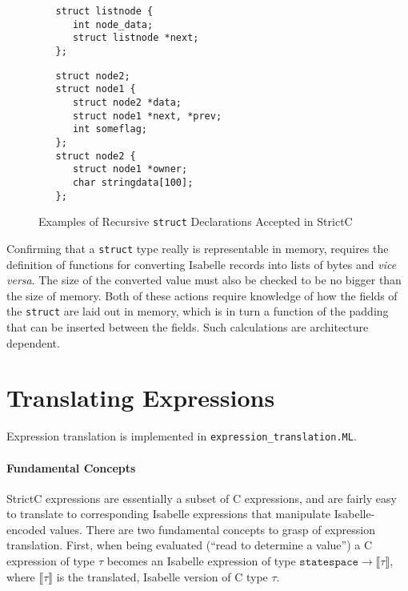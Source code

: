 \documentclass{article}
\newcommand{\strictc}{\textsf{StrictC}}
\newcommand{\MLsuffix}{.ML}
\newcommand{\srcfile}[1]{\texttt{#1}}
\newcommand{\MLfile}[1]{\srcfile{#1\MLsuffix}}
\newcommand{\Sem}[1]{\ensuremath{\llbracket#1\rrbracket}}
\begin{document}
\begin{figure}
\begin{minipage}[t]{0.4\textwidth}
\begin{verbatim}
   struct listnode {
      int node_data;
      struct listnode *next;
   };
\end{verbatim}
\end{minipage}
\qquad\quad
\begin{minipage}[t]{0.4\textwidth}
\begin{verbatim}
   struct node2;
   struct node1 {
      struct node2 *data;
      struct node1 *next, *prev;
      int someflag;
   };
   struct node2 {
      struct node1 *owner;
      char stringdata[100];
   };
\end{verbatim}
\end{minipage}
\caption{Examples of Recursive \texttt{struct} Declarations Accepted
  in \strictc}
\label{fig:struct-examples}
\end{figure}

Confirming that a \texttt{struct} type really is representable in
memory, requires the definition of functions for converting Isabelle
records into lists of bytes and \emph{vice versa}.  The size of the
converted value must also be checked to be no bigger than the size of
memory.  Both of these actions require knowledge of how the fields of
the \texttt{struct} are laid out in memory, which is in turn a
function of the padding that can be inserted between the fields.  Such
calculations are architecture dependent.


\section{Translating Expressions}
\label{sec:expressions}

Expression translation is implemented in
\MLfile{expression\_translation}.

\paragraph{Fundamental Concepts}
\strictc{} expressions are essentially a subset of C expressions, and
are fairly easy to translate to corresponding Isabelle expressions
that manipulate Isabelle-encoded values.  There are two fundamental
concepts to grasp of expression translation.  First, when being
evaluated (``read to determine a value'') a C expression of type
$\tau$ becomes an Isabelle expression of type $\texttt{statespace}
\rightarrow \Sem{\tau}$, where $\Sem{\tau}$ is the translated,
Isabelle version of C type $\tau$.
\end{document}
